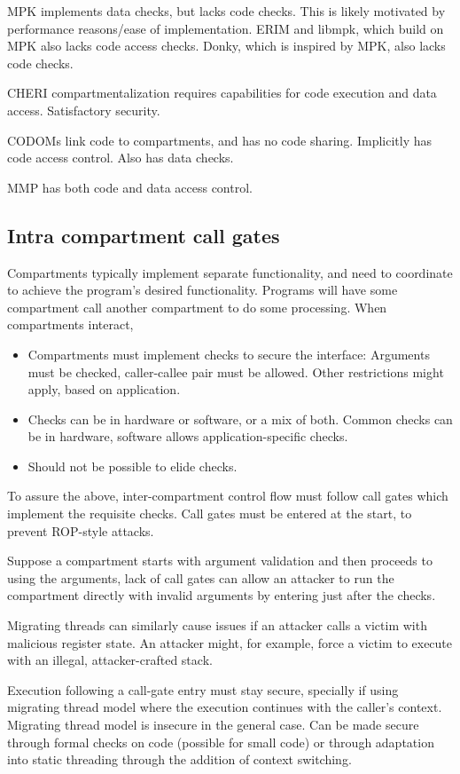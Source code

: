 MPK implements data checks, but lacks code checks. 
This is likely motivated by performance reasons/ease of implementation.
ERIM and libmpk, which build on MPK also lacks code access checks.
Donky, which is inspired by MPK, also lacks code checks.

CHERI compartmentalization requires capabilities for code execution and
data access. Satisfactory security.

CODOMs link code to compartments, and has no code sharing.
Implicitly has code access control.
Also has data checks.

MMP has both code and data access control.

\subsection{Intra compartment call gates}

Compartments typically implement separate functionality, and
need to coordinate to achieve the program's desired functionality.
Programs will have some compartment call another compartment to
do some processing.
When compartments interact, 
\begin{itemize}
      \item Compartments must implement checks to secure the interface:
            Arguments must be checked, caller-callee pair must be
            allowed.
            Other restrictions might apply, based on application.
      \item Checks can be in hardware or software, or a mix of both.
            Common checks can be in hardware, software allows 
            application-specific checks.
      \item Should not be possible to elide checks.
\end{itemize}
To assure the above, inter-compartment control flow must follow call gates
which implement the requisite checks.
Call gates must be entered at the start, to prevent ROP-style attacks.

Suppose a compartment starts with argument validation and then proceeds to
using the arguments, lack of call gates can allow an attacker to run the 
compartment directly with invalid arguments by entering just after the
checks.

Migrating threads can similarly cause issues if an attacker calls a victim
with malicious register state.
An attacker might, for example, force a victim to execute with an illegal,
attacker-crafted stack.

Execution following a call-gate entry must stay secure, specially if using
migrating thread model where the execution continues with the caller's 
context.
Migrating thread model is insecure in the general case. 
Can be made secure through formal checks on code (possible for small code)
or through adaptation into static threading through the addition of context
switching.

